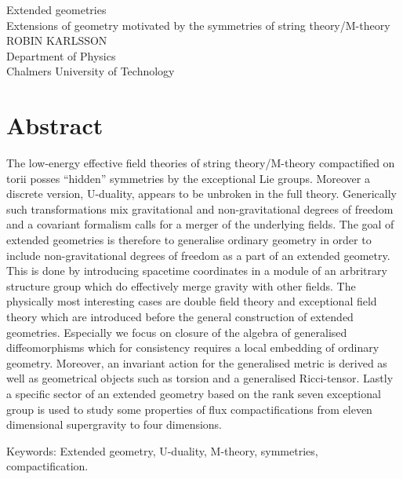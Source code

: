 Extended geometries\\
Extensions of geometry motivated by the symmetries of string theory/M-theory\\
ROBIN KARLSSON\\
Department of Physics\\
Chalmers University of Technology \setlength{\parskip}{0.5cm}

\thispagestyle{plain}			%
\setlength{\parskip}{0pt plus 1.0pt}
\section*{Abstract}
The low-energy effective field theories of string theory/M-theory compactified on torii posses ``hidden'' symmetries by the exceptional Lie groups. Moreover a discrete version, U-duality, appears to be unbroken in the full theory. Generically such transformations mix gravitational and non-gravitational degrees of freedom and a covariant formalism calls for a merger of the underlying fields. The goal of extended geometries is therefore to generalise ordinary geometry in order to include non-gravitational degrees of freedom as a part of an extended geometry. This is done by introducing spacetime coordinates in a module of an arbritrary structure group which do effectively merge gravity with other fields. The physically most interesting cases are double field theory and exceptional field theory which are introduced before the general construction of extended geometries. Especially we focus on closure of the algebra of generalised diffeomorphisms which for consistency requires a local embedding of ordinary geometry. Moreover, an invariant action for the generalised metric is derived as well as geometrical objects such as torsion and a generalised Ricci-tensor. Lastly a specific sector of an extended geometry based on the rank seven exceptional group is used to study some properties of flux compactifications from eleven dimensional supergravity to four dimensions. 








\vfill
Keywords: Extended geometry, U-duality, M-theory, symmetries, compactification.

\newpage				%
\thispagestyle{empty}
\mbox{}